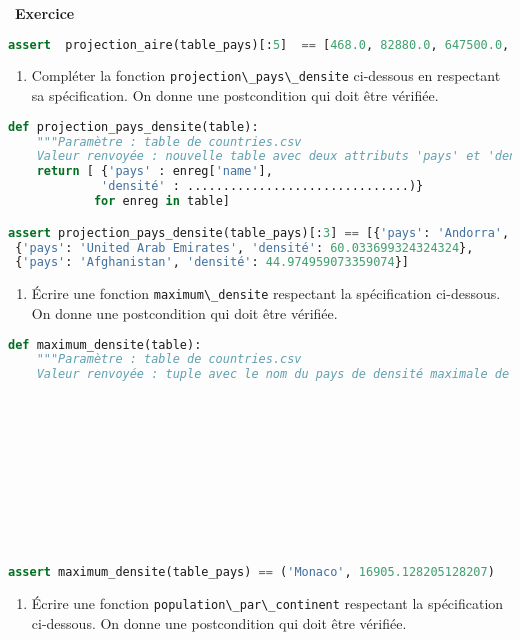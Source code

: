 \documentclass[
  11pt,
]{article}
\newcommand{\passthrough}[1]{#1}
\providecommand{\tightlist}{%
  \setlength{\itemsep}{0pt}\setlength{\parskip}{0pt}}
\newcounter{exo}
\newenvironment{exercice}[1]
{\par \medskip   \addtocounter{exo}{1} \noindent  
\begin{bclogo}[arrondi =0.1,   noborder = true, logo=\bccrayon, marge=4]{~\textbf{Exercice} \textbf{\theexo} {\itshape #1} }  \par}
{
\end{bclogo}
 \par \bigskip }
\newcounter{def}
\begin{document}
\begin{exercice}{}
\begin{lstlisting}[language=Python]
assert  projection_aire(table_pays)[:5]  == [468.0, 82880.0, 647500.0, 443.0, 102.0]
\end{lstlisting}

\begin{enumerate}
\def\labelenumi{\arabic{enumi}.}
\setcounter{enumi}{5}
\tightlist
\item
  Compléter la fonction
  \passthrough{\lstinline!projection\_pays\_densite!} ci-dessous en
  respectant sa spécification. On donne une postcondition qui doit être
  vérifiée.
\end{enumerate}

\begin{lstlisting}[language=Python]
def projection_pays_densite(table):
    """Paramètre : table de countries.csv
    Valeur renvoyée : nouvelle table avec deux attributs 'pays' et 'densité' de population"""
    return [ {'pays' : enreg['name'], 
             'densité' : ...............................)}
            for enreg in table]

assert projection_pays_densite(table_pays)[:3] == [{'pays': 'Andorra', 'densité': 179.48717948717947},
 {'pays': 'United Arab Emirates', 'densité': 60.033699324324324},
 {'pays': 'Afghanistan', 'densité': 44.974959073359074}]
\end{lstlisting}

\begin{enumerate}
\def\labelenumi{\arabic{enumi}.}
\setcounter{enumi}{6}
\tightlist
\item
  Écrire une fonction \passthrough{\lstinline!maximum\_densite!}
  respectant la spécification ci-dessous. On donne une postcondition qui
  doit être vérifiée.
\end{enumerate}

\begin{lstlisting}[language=Python]
def maximum_densite(table):
    """Paramètre : table de countries.csv
    Valeur renvoyée : tuple avec le nom du pays de densité maximale de population et cette densité maximale"""











assert maximum_densite(table_pays) == ('Monaco', 16905.128205128207)
\end{lstlisting}

\begin{enumerate}
\def\labelenumi{\arabic{enumi}.}
\setcounter{enumi}{7}
\tightlist
\item
  Écrire une fonction
  \passthrough{\lstinline!population\_par\_continent!} respectant la
  spécification ci-dessous. On donne une postcondition qui doit être
  vérifiée.
\end{enumerate}


\end{exercice}
\end{document}
